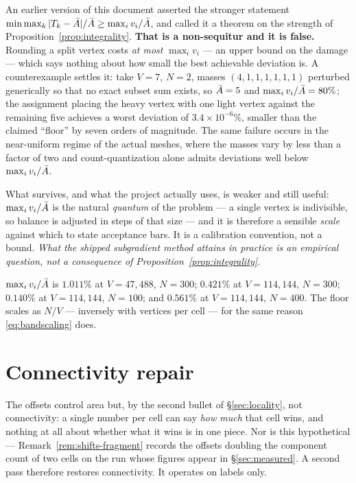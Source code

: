 \documentclass[11pt,a4paper]{article}
\begin{document}
\begin{remark}
\label{rem:floor-correction}
An earlier version of this document asserted the stronger statement
$\min \max_k |T_k - \bar{A}|/\bar{A} \ge \max_i v_i / \bar{A}$, and called it a theorem
on the strength of Proposition~\ref{prop:integrality}. \textbf{That is a
non-sequitur and it is false.} Rounding a split vertex costs \emph{at most}
$\max_i v_i$ --- an upper bound on the damage --- which says nothing about how
small the best achievable deviation is. A counterexample settles it: take $V=7$,
$N=2$, masses $(4,1,1,1,1,1,1)$ perturbed generically so that no exact subset sum
exists, so $\bar{A} = 5$ and $\max_i v_i/\bar{A} = 80\%$; the assignment placing the
heavy vertex with one light vertex against the remaining five achieves a worst
deviation of $3.4\times 10^{-6}\%$, smaller than the claimed ``floor'' by seven
orders of magnitude. The same failure occurs in the near-uniform regime of the
actual meshes, where the masses vary by less than a factor of two and
count-quantization alone admits deviations well below $\max_i v_i/\bar{A}$.

What survives, and what the project actually uses, is weaker and still useful:
$\max_i v_i / \bar{A}$ is the natural \emph{quantum} of the problem --- a single
vertex is indivisible, so balance is adjusted in steps of that size --- and it is
therefore a sensible \emph{scale} against which to state acceptance bars. It is a
calibration convention, not a bound. \emph{What the shipped subgradient method
attains in practice is an empirical question, not a consequence of
Proposition~\ref{prop:integrality}.}
\end{remark}

\begin{remark}
$\max_i v_i / \bar{A}$ is $1.011\%$ at $V=47{,}488$, $N=300$; $0.421\%$ at
$V=114{,}144$, $N=300$; $0.140\%$ at $V=114{,}144$, $N=100$; and $0.561\%$ at
$V=114{,}144$, $N=400$. The floor scales as $N/V$ --- inversely with vertices per
cell --- for the same reason \eqref{eq:bandscaling} does.
\end{remark}

\section{Connectivity repair}
\label{sec:repair}

The offsets control area but, by the second bullet of \S\ref{sec:locality}, not
connectivity: a single number per cell can say \emph{how much} that cell wins, and
nothing at all about whether what it wins is in one piece. Nor is this hypothetical
--- Remark~\ref{rem:shifts-fragment} records the offsets doubling the component
count of two cells on the run whose figures appear in \S\ref{sec:measured}. A
second pass therefore restores connectivity. It operates on labels only.
\end{document}

